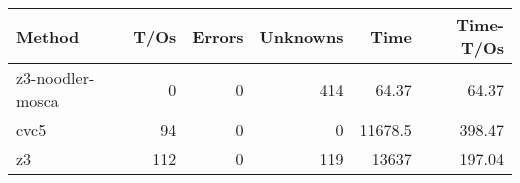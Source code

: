 \begin{tabular}{lrrrrr}
\hline
 Method           &   T/Os &   Errors &   Unknowns &     Time &   Time-T/Os \\
\hline
 z3-noodler-mosca &      0 &        0 &        414 &    64.37 &       64.37 \\
 cvc5             &     94 &        0 &          0 & 11678.5  &      398.47 \\
 z3               &    112 &        0 &        119 & 13637    &      197.04 \\
\hline
\end{tabular}
